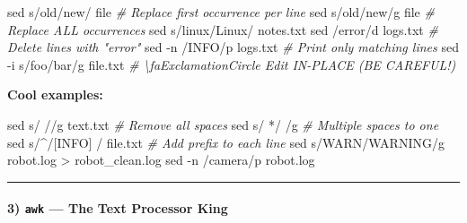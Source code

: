 \documentclass[
  english,
  paper=a4,
  oneside  ,captions=tableheading
]{scrartcl}
\newenvironment{Shaded}{}{}
\newcommand{\AttributeTok}[1]{\textcolor[rgb]{0.49,0.56,0.16}{#1}}
\newcommand{\CommentTok}[1]{\textcolor[rgb]{0.38,0.63,0.69}{\textit{#1}}}
\newcommand{\FunctionTok}[1]{\textcolor[rgb]{0.02,0.16,0.49}{#1}}
\newcommand{\NormalTok}[1]{#1}
\newcommand{\OperatorTok}[1]{\textcolor[rgb]{0.40,0.40,0.40}{#1}}
\newcommand{\StringTok}[1]{\textcolor[rgb]{0.25,0.44,0.63}{#1}}
\begin{document}
\begin{Shaded}
\begin{Highlighting}[]
\FunctionTok{sed} \StringTok{\textquotesingle{}s/old/new/\textquotesingle{}}\NormalTok{ file                       }\CommentTok{\# Replace first occurrence per line}
\FunctionTok{sed} \StringTok{\textquotesingle{}s/old/new/g\textquotesingle{}}\NormalTok{ file                      }\CommentTok{\# Replace ALL occurrences}
\FunctionTok{sed} \StringTok{\textquotesingle{}s/linux/Linux/\textquotesingle{}}\NormalTok{ notes.txt}
\FunctionTok{sed} \StringTok{\textquotesingle{}/error/d\textquotesingle{}}\NormalTok{ logs.txt                     }\CommentTok{\# Delete lines with "error"}
\FunctionTok{sed} \AttributeTok{{-}n} \StringTok{\textquotesingle{}/INFO/p\textquotesingle{}}\NormalTok{ logs.txt                  }\CommentTok{\# Print only matching lines}
\FunctionTok{sed} \AttributeTok{{-}i} \StringTok{\textquotesingle{}s/foo/bar/g\textquotesingle{}}\NormalTok{ file.txt              }\CommentTok{\# \textbackslash{}faExclamationCircle Edit IN{-}PLACE (BE CAREFUL!)}
\end{Highlighting}
\end{Shaded}

\textbf{Cool examples:}

\begin{Shaded}
\begin{Highlighting}[]
\FunctionTok{sed} \StringTok{\textquotesingle{}s/ //g\textquotesingle{}}\NormalTok{ text.txt                       }\CommentTok{\# Remove all spaces}
\FunctionTok{sed} \StringTok{\textquotesingle{}s/  */ /g\textquotesingle{}}                             \CommentTok{\# Multiple spaces to one}
\FunctionTok{sed} \StringTok{\textquotesingle{}s/\^{}/[INFO] /\textquotesingle{}}\NormalTok{ file.txt                }\CommentTok{\# Add prefix to each line}
\FunctionTok{sed} \StringTok{\textquotesingle{}s/WARN/WARNING/g\textquotesingle{}}\NormalTok{ robot.log }\OperatorTok{\textgreater{}}\NormalTok{ robot\_clean.log}
\FunctionTok{sed} \AttributeTok{{-}n} \StringTok{\textquotesingle{}/camera/p\textquotesingle{}}\NormalTok{ robot.log}
\end{Highlighting}
\end{Shaded}

\begin{center}\rule{0.5\linewidth}{0.5pt}\end{center}

\paragraph{\texorpdfstring{3) \texttt{awk} --- The Text Processor
King}{3) awk --- The Text Processor King}}\label{awk-the-text-processor-king}
\end{document}
